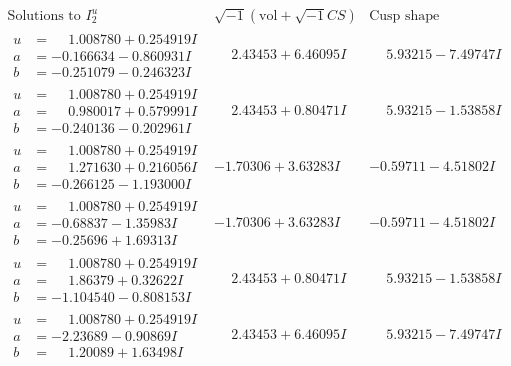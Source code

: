\documentclass[1p]{elsarticle_modified}
\theoremstyle{definition}
\newcommand{\I}{\sqrt{-1}}
\begin{document}
$$\begin{array}{c|c|c}  
\text{Solutions to }I^u_{2}& \I (\text{vol} + \sqrt{-1}CS) & \text{Cusp shape}\\
 \hline 
\begin{aligned}
u &= \phantom{-}1.008780 + 0.254919 I \\
a &= -0.166634 - 0.860931 I \\
b &= -0.251079 - 0.246323 I\end{aligned}
 & \phantom{-}2.43453 + 6.46095 I & \phantom{-}5.93215 - 7.49747 I \\ \hline\begin{aligned}
u &= \phantom{-}1.008780 + 0.254919 I \\
a &= \phantom{-}0.980017 + 0.579991 I \\
b &= -0.240136 - 0.202961 I\end{aligned}
 & \phantom{-}2.43453 + 0.80471 I & \phantom{-}5.93215 - 1.53858 I \\ \hline\begin{aligned}
u &= \phantom{-}1.008780 + 0.254919 I \\
a &= \phantom{-}1.271630 + 0.216056 I \\
b &= -0.266125 - 1.193000 I\end{aligned}
 & -1.70306 + 3.63283 I & -0.59711 - 4.51802 I \\ \hline\begin{aligned}
u &= \phantom{-}1.008780 + 0.254919 I \\
a &= -0.68837 - 1.35983 I \\
b &= -0.25696 + 1.69313 I\end{aligned}
 & -1.70306 + 3.63283 I & -0.59711 - 4.51802 I \\ \hline\begin{aligned}
u &= \phantom{-}1.008780 + 0.254919 I \\
a &= \phantom{-}1.86379 + 0.32622 I \\
b &= -1.104540 - 0.808153 I\end{aligned}
 & \phantom{-}2.43453 + 0.80471 I & \phantom{-}5.93215 - 1.53858 I \\ \hline\begin{aligned}
u &= \phantom{-}1.008780 + 0.254919 I \\
a &= -2.23689 - 0.90869 I \\
b &= \phantom{-}1.20089 + 1.63498 I\end{aligned}
 & \phantom{-}2.43453 + 6.46095 I & \phantom{-}5.93215 - 7.49747 I \\ \hline\begin{aligned}

\end{aligned}
\end{array}$$
\end{document}
